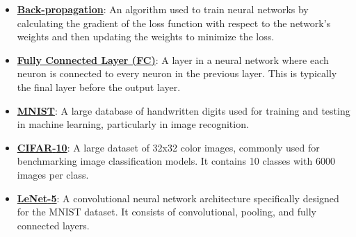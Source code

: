 \documentclass{article}%
\begin{document}
\begin{itemize}[leftmargin=*]
\item \href{https://purdue.brightspace.com/d2l/common/assets/pdfjs-d2l-dist/1.0.14-legacy/web/viewer.html?file=%2Fcontent%2Fenforced%2F1095467-wl.202510.CS.24300.001%2F09L1-cnn.pdf%3Fou%3D1095467&lang=en-us&container=d2l-fileviewer-rendered-pdf&fullscreen=d2l-fileviewer-rendered-pdf-dialog&height=667#page=16}{\textbf{Back{-}propagation}}: An algorithm used to train neural networks by calculating the gradient of the loss function with respect to the network's weights and then updating the weights to minimize the loss.%
\item \href{https://purdue.brightspace.com/d2l/common/assets/pdfjs-d2l-dist/1.0.14-legacy/web/viewer.html?file=%2Fcontent%2Fenforced%2F1095467-wl.202510.CS.24300.001%2F09L1-cnn.pdf%3Fou%3D1095467&lang=en-us&container=d2l-fileviewer-rendered-pdf&fullscreen=d2l-fileviewer-rendered-pdf-dialog&height=667#page=17}{\textbf{Fully Connected Layer (FC)}}: A layer in a neural network where each neuron is connected to every neuron in the previous layer. This is typically the final layer before the output layer.%
\item \href{https://purdue.brightspace.com/d2l/common/assets/pdfjs-d2l-dist/1.0.14-legacy/web/viewer.html?file=%2Fcontent%2Fenforced%2F1095467-wl.202510.CS.24300.001%2F09L1-cnn.pdf%3Fou%3D1095467&lang=en-us&container=d2l-fileviewer-rendered-pdf&fullscreen=d2l-fileviewer-rendered-pdf-dialog&height=667#page=21}{\textbf{MNIST}}: A large database of handwritten digits used for training and testing in machine learning, particularly in image recognition.%
\item \href{https://purdue.brightspace.com/d2l/common/assets/pdfjs-d2l-dist/1.0.14-legacy/web/viewer.html?file=%2Fcontent%2Fenforced%2F1095467-wl.202510.CS.24300.001%2F09L1-cnn.pdf%3Fou%3D1095467&lang=en-us&container=d2l-fileviewer-rendered-pdf&fullscreen=d2l-fileviewer-rendered-pdf-dialog&height=667#page=23}{\textbf{CIFAR{-}10}}: A large dataset of 32x32 color images, commonly used for benchmarking image classification models. It contains 10 classes with 6000 images per class.%
\item \href{https://purdue.brightspace.com/d2l/common/assets/pdfjs-d2l-dist/1.0.14-legacy/web/viewer.html?file=%2Fcontent%2Fenforced%2F1095467-wl.202510.CS.24300.001%2F09L1-cnn.pdf%3Fou%3D1095467&lang=en-us&container=d2l-fileviewer-rendered-pdf&fullscreen=d2l-fileviewer-rendered-pdf-dialog&height=667#page=22}{\textbf{LeNet{-}5}}: A convolutional neural network architecture specifically designed for the MNIST dataset. It consists of convolutional, pooling, and fully connected layers.%
\end{itemize}%
\end{document}
